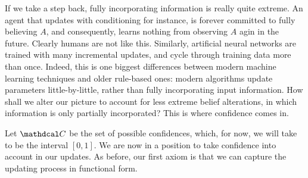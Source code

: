 

If we take a step back, fully incorporating information is really quite extreme.
An agent that updates with conditioning for instance, is forever committed to fully believing $A$, and consequently, learns nothing from observing $A$ agin in the future.
Clearly humans are not like this.
Similarly, artificial neural networks are trained with many incremental updates, and cycle through training data more than once.
Indeed, this is one biggest differences between modern machine learning techniques and  older rule-based ones: modern algorithms update parameters little-by-little, rather than fully incorporating input information.
How shall we alter our picture to account for less extreme belief alterations, in which information is only partially incorporated?
This is where confidence comes in.





Let $\confdom$ be the set of possible confidences, which, for now, we will take to be the interval $[0, 1]$.
We are now in a position to take confidence into account in our updates.
As before, our first axiom is that we can capture the updating process in functional form.


